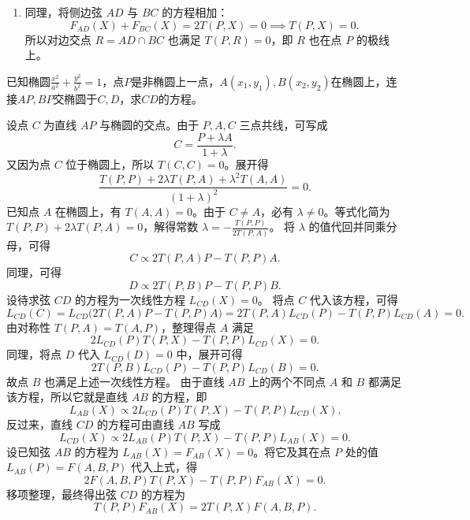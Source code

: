 \begin{solution}
\begin{enumerate}
    \item 同理，将侧边弦 $AD$ 与 $BC$ 的方程相加：
    \[ F_{AD}(X) + F_{BC}(X) = 2T(P,X) = 0 \implies T(P,X) = 0. \]
    所以对边交点 $R = AD \cap BC$ 也满足 $T(P,R) = 0$，即 $R$ 也在点 $P$ 的极线上。
\end{enumerate}
\end{solution}

\begin{exercise}[蝴蝶定理]
已知椭圆$\frac{x^2}{a^2}+\frac{y^2}{b^2}=1$，点$P$是非椭圆上一点，$A(x_1,y_1),B(x_2,y_2)$在椭圆上，连接$AP,BP$交椭圆于$C,D$，求$CD$的方程。
\end{exercise}
\begin{solution}
设点 $C$ 为直线 $AP$ 与椭圆的交点。由于 $P, A, C$ 三点共线，可写成
\[
C = \frac{P + \lambda A}{1+\lambda}.
\]
又因为点 $C$ 位于椭圆上，所以 $T(C,C) = 0$。展开得
\[ \frac{T(P,P) + 2\lambda T(P,A) + \lambda^2 T(A,A)}{(1+\lambda)^2} = 0. \]
已知点 $A$ 在椭圆上，有 $T(A,A) = 0$。由于 $C \neq A$，必有 $\lambda \neq 0$。等式化简为 $T(P,P) + 2\lambda T(P,A) = 0$，解得常数 $\lambda = -\frac{T(P,P)}{2T(P,A)}$。
将 $\lambda$ 的值代回并同乘分母，可得
\[ C \propto 2T(P,A)P - T(P,P)A. \]
同理，可得
\[ D \propto 2T(P,B)P - T(P,P)B. \]
设待求弦 $CD$ 的方程为一次线性方程 $L_{CD}(X) = 0$。
将点 $C$ 代入该方程，可得
\[ L_{CD}(C) = L_{CD}\big(2T(P,A)P - T(P,P)A\big) = 2T(P,A)L_{CD}(P) - T(P,P)L_{CD}(A) = 0. \]
由对称性 $T(P,A) = T(A,P)$，整理得点 $A$ 满足
\[ 2L_{CD}(P)T(P,X) - T(P,P)L_{CD}(X) = 0. \]
同理，将点 $D$ 代入 $L_{CD}(D) = 0$ 中，展开可得
\[ 2T(P,B)L_{CD}(P) - T(P,P)L_{CD}(B) = 0. \]
故点 $B$ 也满足上述一次线性方程。
由于直线 $AB$ 上的两个不同点 $A$ 和 $B$ 都满足该方程，所以它就是直线 $AB$ 的方程，即
\[ L_{AB}(X) \propto 2L_{CD}(P)T(P,X) - T(P,P)L_{CD}(X). \]
反过来，直线 $CD$ 的方程可由直线 $AB$ 写成
\[ L_{CD}(X) \propto 2L_{AB}(P)T(P,X) - T(P,P)L_{AB}(X) = 0. \]
设已知弦 $AB$ 的方程为 $L_{AB}(X) = F_{AB}(X) = 0$。将它及其在点 $P$ 处的值 $L_{AB}(P) = F(A,B,P)$ 代入上式，得
\[ 2 F(A,B,P) T(P,X) - T(P,P) F_{AB}(X) = 0. \]
移项整理，最终得出弦 $CD$ 的方程为
\[ T(P,P) F_{AB}(X) = 2 T(P,X) F(A,B,P). \]
\end{solution}

